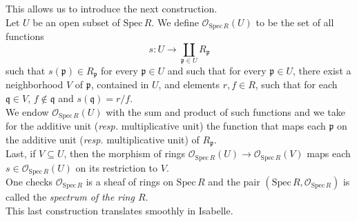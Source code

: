 \documentclass[12pt]{scrartcl}
\def\spec{\text{Spec}\,R}
\begin{document}
This allows us to introduce the next construction.	\\
Let $U$ be an open subset of $\text{Spec}\,R$. We define $\mathscr{O}_{\spec}(U)$ to be the set of all functions 
	\[
	s: U \rightarrow \coprod \limits_{\mathfrak{p} \in U} R_{\mathfrak{p}}
	\]
such that $s(\mathfrak{p}) \in R_{\mathfrak{p}}$ for every $\mathfrak{p} \in U$ and such that for every $\mathfrak{p} \in U$, there exist a neighborhood $V$ of $\mathfrak{p}$, contained in $U$, and elements $r, f \in R$, such that for each $\mathfrak{q} \in V$, $f \notin \mathfrak{q}$ and $s(\mathfrak{q}) = r/f$. \\
We endow $\mathscr{O}_{\spec}(U)$ with the sum and product of such functions and we take for the additive unit (\textit{resp.} multiplicative unit) the function that maps each $\mathfrak{p}$ on the additive unit (\textit{resp.} multiplicative unit) of $R_{\mathfrak{p}}$. \\
Last, if $V \subseteq U$, then the morphism of rings $\mathscr{O}_{\spec}(U) \rightarrow \mathscr{O}_{\spec}(V)$ maps each $s \in \mathscr{O}_{\spec}(U)$ on its restriction to $V$. \\
One checks $\mathscr{O}_{\spec}$ is a sheaf of rings on $\text{Spec}\,R$ and the pair $(\text{Spec}\,R, \mathscr{O}_{\spec})$ is called the \emph{spectrum of the ring $R$}. \\
This last construction translates smoothly in Isabelle. 

\end{document}
